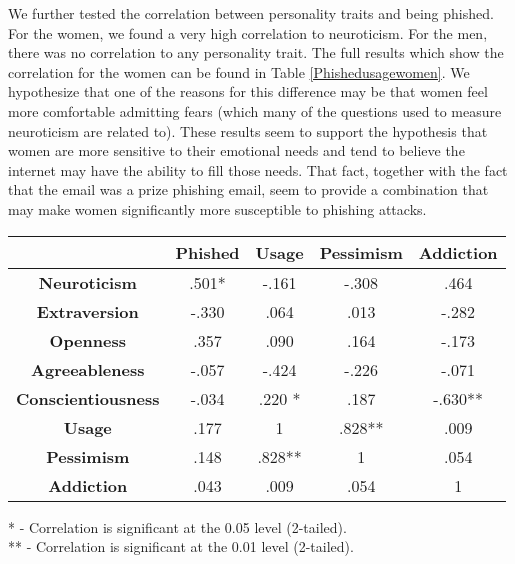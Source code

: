 \documentclass{sig-alternate}
\begin{document}
We further tested the correlation between personality traits and being phished. For the women, we found a very high correlation to neuroticism.
For the men, there was no correlation to any personality trait. 
The full results which show the correlation for the women  
can be found in Table \ref{Phishedusagewomen}.
We hypothesize that one of the reasons for this difference may be that women feel more comfortable admitting fears (which many of the questions used to measure neuroticism are related to). 
These results seem to support the hypothesis that women are more sensitive to their emotional needs and tend to believe the internet may have the ability to fill those needs. That fact, together with the fact that the email was a prize phishing email, seem to provide a combination that may make women significantly more susceptible to phishing attacks.








\begin{table*}[ht]
\begin{center}
\begin{tabular}{|c|c|c|c|c|}
\hline
&  \textbf{Phished} & \textbf{Usage}  &  \textbf{Pessimism} & \textbf{Addiction}\\
\hline
\hline
\textbf{Neuroticism} & .501*	& -.161	& -.308	& .464\\
\hline
\textbf{Extraversion} & -.330	& .064	& .013	& -.282\\
\hline
\textbf{Openness} & .357	& .090	& .164	& -.173\\
\hline
\textbf{Agreeableness} & -.057	& -.424	& -.226	& -.071\\
\hline
\textbf{Conscientiousness} & -.034	& .220	* & .187	& -.630**\\
\hline
\textbf{Usage}  & .177	& 1	& .828**	& .009\\
\hline
\textbf{Pessimism} & .148	& .828**	& 1	& .054\\
\hline
\textbf{Addiction} & .043	& .009	& .054	& 1\\
\hline

\end{tabular}

\vspace{5mm}
* - Correlation is significant at the 0.05 level (2-tailed).\\
** - Correlation is significant at the 0.01 level (2-tailed).\\

\caption{Phishing and personality factors correlation for women}
\label{Phishedusagewomen}
\end{center}
\vspace{5mm}
\end{table*}
\end{document}
